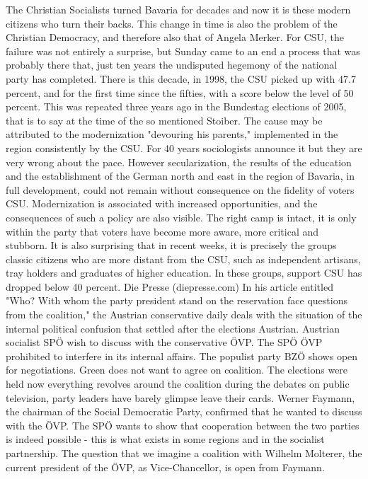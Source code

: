 The Christian Socialists turned Bavaria for decades and now it is these modern citizens who turn their backs.
This change in time is also the problem of the Christian Democracy, and therefore also that of Angela Merker.
For CSU, the failure was not entirely a surprise, but Sunday came to an end a process that was probably there that, just ten years the undisputed hegemony of the national party has completed.
There is this decade, in 1998, the CSU picked up with 47.7 percent, and for the first time since the fifties, with a score below the level of 50 percent.
This was repeated three years ago in the Bundestag elections of 2005, that is to say at the time of the so mentioned Stoiber.
The cause may be attributed to the modernization "devouring his parents," implemented in the region consistently by the CSU.
For 40 years sociologists announce it but they are very wrong about the pace. However secularization, the results of the education and the establishment of the German north and east in the region of Bavaria, in full development, could not remain without consequence on the fidelity of voters CSU.
Modernization is associated with increased opportunities, and the consequences of such a policy are also visible.
The right camp is intact, it is only within the party that voters have become more aware, more critical and stubborn.
It is also surprising that in recent weeks, it is precisely the groups classic citizens who are more distant from the CSU, such as independent artisans, tray holders and graduates of higher education.
In these groups, support CSU has dropped below 40 percent.
Die Presse (diepresse.com)
In his article entitled "Who? With whom the party president stand on the reservation face questions from the coalition," the Austrian conservative daily deals with the situation of the internal political confusion that settled after the elections Austrian.
Austrian socialist SPÖ wish to discuss with the conservative ÖVP.
The SPÖ ÖVP prohibited to interfere in its internal affairs.
The populist party BZÖ shows open for negotiations. Green does not want to agree on coalition.
The elections were held now everything revolves around the coalition during the debates on public television, party leaders have barely glimpse leave their cards.
Werner Faymann, the chairman of the Social Democratic Party, confirmed that he wanted to discuss with the ÖVP.
The SPÖ wants to show that cooperation between the two parties is indeed possible - this is what exists in some regions and in the socialist partnership.
The question that we imagine a coalition with Wilhelm Molterer, the current president of the ÖVP, as Vice-Chancellor, is open from Faymann.
